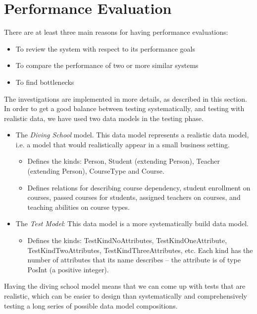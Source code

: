 
\section{\label{sec:PerformanceEvaluation}Performance Evaluation}

There are at least three main reasons for having performance evaluations:
\begin{itemize}
\item To review the system with respect to its performance goals
\item To compare the performance of two or more similar systems
\item To find bottlenecks
\end{itemize}
The investigations are implemented in more details, as described in
this section. In order to get a good balance between testing systematically,
and testing with realistic data, we have used two data models in the
testing phase.
\begin{itemize}
\item The \emph{Diving School} model. This data model represents a realistic
data model, i.e. a model that would realistically appear in a small
business setting.

\begin{itemize}
\item Defines the kinds: Person, Student (extending Person), Teacher (extending
Person), CourseType and Course.
\item Defines relations for describing course dependency, student enrollment
on courses, passed courses for students, assigned teachers on courses,
and teaching abilities on course types.
\end{itemize}
\item The \emph{Test Model}: This data model is a more systematically build
data model.

\begin{itemize}
\item Defines the kinds: TestKindNoAttributes, TestKindOneAttribute, TestKindTwoAttributes,
TestKindThreeAttributes, etc. Each kind has the number of attributes
that its name describes -- the attribute is of type PosInt (a positive
integer).
\end{itemize}
\end{itemize}
Having the diving school model means that we can come up with tests
that are realistic, which can be easier to design than systematically
and comprehensively testing a long series of possible data model compositions.

